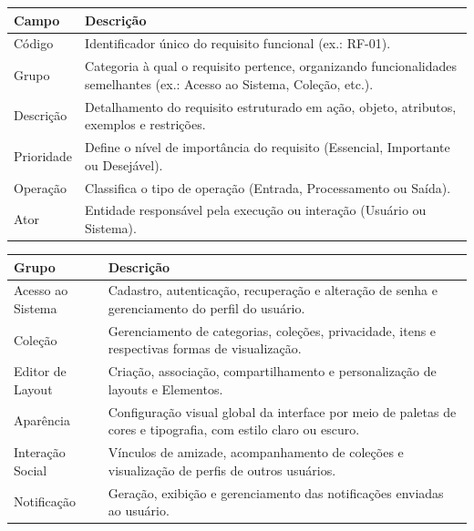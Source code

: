 \begin{quadro}[h!]
\caption{Descrição dos Campos dos Requisitos Funcionais}
\label{quad:descricao_campos}
\begin{tabular}{|p{4cm}|p{11cm}|}
\hline
\textbf{Campo} & \textbf{Descrição} \\ \hline
Código & Identificador único do requisito funcional (ex.: RF-01). \\ \hline
Grupo & Categoria à qual o requisito pertence, organizando funcionalidades semelhantes (ex.: Acesso ao Sistema, Coleção, etc.). \\ \hline
Descrição & Detalhamento do requisito estruturado em ação, objeto, atributos, exemplos e restrições. \\ \hline
Prioridade & Define o nível de importância do requisito (Essencial, Importante ou Desejável). \\ \hline
Operação & Classifica o tipo de operação (Entrada, Processamento ou Saída). \\ \hline
Ator & Entidade responsável pela execução ou interação (Usuário ou Sistema). \\ \hline
\end{tabular}
\end{quadro}

\begin{quadro}[h!]
\caption{Grupos de Requisitos Funcionais}
\label{quad:grupos}
\begin{tabular}{|p{5cm}|p{10cm}|}
\hline
\textbf{Grupo} & \textbf{Descrição} \\ \hline
Acesso ao Sistema & Cadastro, autenticação, recuperação e alteração de senha e gerenciamento do perfil do usuário. \\ \hline
Coleção & Gerenciamento de categorias, coleções, privacidade, itens e respectivas formas de visualização. \\ \hline
Editor de Layout & Criação, associação, compartilhamento e personalização de layouts e Elementos. \\ \hline
Aparência & Configuração visual global da interface por meio de paletas de cores e tipografia, com estilo claro ou escuro. \\ \hline
Interação Social & Vínculos de amizade, acompanhamento de coleções e visualização de perfis de outros usuários. \\ \hline
Notificação & Geração, exibição e gerenciamento das notificações enviadas ao usuário. \\ \hline
\end{tabular}
\end{quadro}


